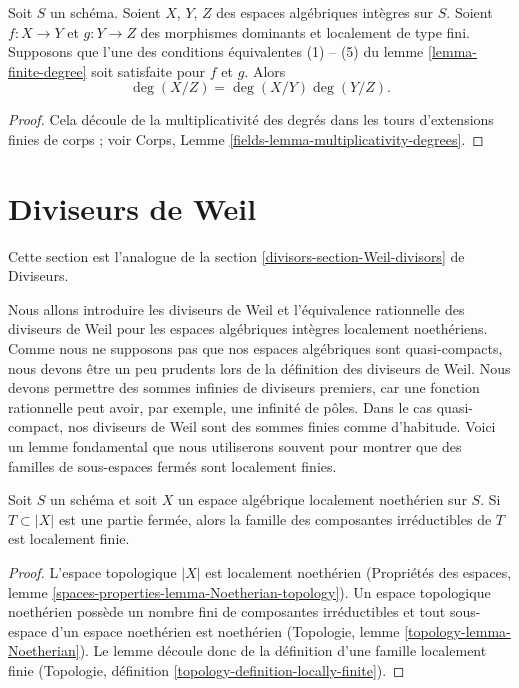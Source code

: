 \begin{lemma}
\label{lemma-degree-composition}
Soit $S$ un schéma.
Soient $X$, $Y$, $Z$ des espaces algébriques intègres sur $S$.
Soient $f : X \to Y$ et $g : Y \to Z$ des morphismes dominants et localement
de type fini. Supposons que l'une des conditions équivalentes
(1) -- (5) du lemme \ref{lemma-finite-degree} soit satisfaite pour $f$ et $g$. Alors
$$
\deg(X/Z) = \deg(X/Y) \deg(Y/Z).
$$
\end{lemma}

\begin{proof}
Cela découle de la multiplicativité des degrés dans les tours
d'extensions finies de corps ; voir
Corps, Lemme \ref{fields-lemma-multiplicativity-degrees}.
\end{proof}










\section{Diviseurs de Weil}
\label{section-Weil-divisors}

\noindent
Cette section est l'analogue de la section
\ref{divisors-section-Weil-divisors} de Diviseurs.

\medskip\noindent
Nous allons introduire les diviseurs de Weil et l'équivalence rationnelle des
diviseurs de Weil pour les espaces algébriques intègres localement noethériens.
Comme nous ne supposons pas que nos espaces algébriques sont quasi-compacts, nous devons
être un peu prudents lors de la définition des diviseurs de Weil. Nous devons permettre
des sommes infinies de diviseurs premiers, car une fonction rationnelle peut avoir,
par exemple, une infinité de pôles. Dans le cas quasi-compact, nos diviseurs
de Weil sont des sommes finies comme d'habitude. Voici un lemme fondamental que nous
utiliserons souvent pour montrer que des familles de sous-espaces fermés sont localement finies.

\begin{lemma}
\label{lemma-components-locally-finite}
Soit $S$ un schéma et soit $X$ un espace algébrique localement noethérien
sur $S$. Si $T \subset |X|$ est une partie fermée,
alors la famille des composantes irréductibles de $T$ est localement finie.
\end{lemma}

\begin{proof}
L'espace topologique $|X|$ est localement noethérien
(Propriétés des espaces, lemme \ref{spaces-properties-lemma-Noetherian-topology}).
Un espace topologique noethérien possède un nombre fini de
composantes irréductibles et tout sous-espace d'un espace noethérien est noethérien
(Topologie, lemme \ref{topology-lemma-Noetherian}).
Le lemme découle donc de la définition d'une famille localement finie
(Topologie, définition \ref{topology-definition-locally-finite}).
\end{proof}

